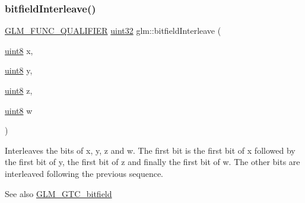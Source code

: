 \subsubsection{\texorpdfstring{bitfield\+Interleave()}{bitfieldInterleave()}\hspace{0.1cm}{\footnotesize\ttfamily [14/16]}}
{\footnotesize\ttfamily \mbox{\hyperlink{setup_8hpp_a33fdea6f91c5f834105f7415e2a64407}{G\+L\+M\+\_\+\+F\+U\+N\+C\+\_\+\+Q\+U\+A\+L\+I\+F\+I\+ER}} \mbox{\hyperlink{group__gtc__type__precision_ga202b6a53c105fcb7e531f9b443518451}{uint32}} glm\+::bitfield\+Interleave (\begin{DoxyParamCaption}\item[{\mbox{\hyperlink{group__gtc__type__precision_ga1a7dcd8aac97cc8020817c94049deff2}{uint8}}}]{x,  }\item[{\mbox{\hyperlink{group__gtc__type__precision_ga1a7dcd8aac97cc8020817c94049deff2}{uint8}}}]{y,  }\item[{\mbox{\hyperlink{group__gtc__type__precision_ga1a7dcd8aac97cc8020817c94049deff2}{uint8}}}]{z,  }\item[{\mbox{\hyperlink{group__gtc__type__precision_ga1a7dcd8aac97cc8020817c94049deff2}{uint8}}}]{w }\end{DoxyParamCaption})}

Interleaves the bits of x, y, z and w. The first bit is the first bit of x followed by the first bit of y, the first bit of z and finally the first bit of w. The other bits are interleaved following the previous sequence.

\begin{DoxySeeAlso}{See also}
\mbox{\hyperlink{group__gtc__bitfield}{G\+L\+M\+\_\+\+G\+T\+C\+\_\+bitfield}} 
\end{DoxySeeAlso}
\mbox{\label{group__gtc__bitfield_ga09ee0be0fac790a1607a711e597dd9bf}} 
